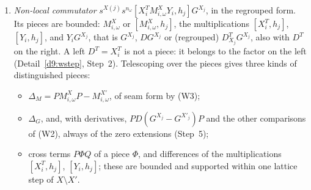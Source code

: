 \begin{detail}
\begin{step}
\begin{enumerate}[label=(\alph*)]
\begin{itemize}
\item At (L3) Detail~\ref{d9:wstep}, Step~2, and Detail~\ref{d9:L3}, Step~4, write the part $\one_XD^T[D,h_j]G^{X_j}$ of $LG^{X_j}$ as a left $D^T$ in front of the $\mathcal A$-part $[D,h_j]G^{X_j}$. Then the two parts are separate factors of the word, and they are compared separately. $[D,h_j]$ is a multiplication by differences of $h_j$, of size $CM^{-1}$ and range one lattice step, and $[D,h_j]G^{X'_j}$ takes values on plaquettes with a corner in $X'$. So $P[D,h_j]G^{X_j}P-[D,h_j]G^{X'_j}=P[D,h_j](G^{X_j}-G^{X'_j})P$, of seam form by (W2). The rest, $LG^{X_j}-\one_XD^T[D,h_j]G^{X_j}$, is compared as in Detail~\ref{d9:L3}, Step~4, through the comparisons of $G^{X_j}$, $DG^{X_j}$, $\nabla G^{X_j}$ and of the torus divergence in (W2).
\item The cross term $PLG^{X_j}Q$ has its input in $\Sigma$, and $|LG^{X_j}|_{2\gamma}\le C_GC_{\rm loc}M^{-1}$ by the hypothesis of Lemma~. At (L3) the cross terms $P[D,h_j]G^{X_j}Q$ and $P(LG^{X_j}-\one_XD^T[D,h_j]G^{X_j})Q$ of the two parts are bounded in the same way, by Detail~\ref{d9:L3}, Step~4.
\end{itemize}
Apart from the split at (L3), whose left $D^T$ is part of the propagator on its left, the factor is not split by the projections: in such a split, the piece $PLQ\,G^{X_j}P$ differentiates the field $QG^{X_j}Pf$, which is cut sharply at $\partial X'$, and it is not bounded uniformly in $\eta$ when $\supp\partial h_j$ meets $\partial X'$.
\item \emph{Non-local commutator} $s^{X(j)}s^{n_\omega}[X_i^TM^X_{i,\omega}Y_i,h_j]G^{X_j}$, in the regrouped form. Its pieces are bounded: $M^X_{i,\omega}$ or $[M^X_{i,\omega},h_j]$, the multiplications $[X_i^T,h_j]$, $[Y_i,h_j]$, and $Y_iG^{X_j}$, that is $G^{X_j}$, $DG^{X_j}$ or (regrouped) $D^T_{X_j}G^{X_j}$, also with $D^T$ on the right. A left $D^T=X_i^T$ is not a piece: it belongs to the factor on the left (Detail~\ref{d9:wstep}, Step~2). Telescoping over the pieces gives three kinds of distinguished pieces:
\begin{itemize}
\item $\Delta_M=PM^X_{i,\omega}P-M^{X'}_{i,\omega}$, of seam form by (W3);
\item $\Delta_G$, and, with derivatives, $PD(G^{X_j}-G^{X'_j})P$ and the other comparisons of (W2), always of the zero extensions (Step~5);
\item cross terms $P\Phi Q$ of a piece $\Phi$, and differences of the multiplications $[X_i^T,h_j]$, $[Y_i,h_j]$; these are bounded and supported within one lattice step of $X\setminus X'$.

\end{itemize}
\end{enumerate}
\end{step}
\end{detail}
